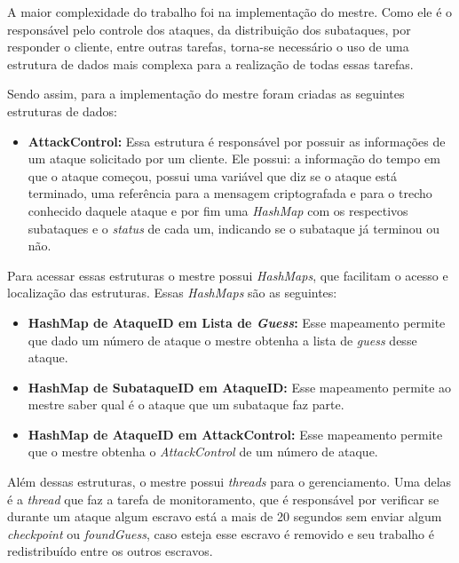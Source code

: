 \documentclass[
	12pt,				%
    oneside,			%
	a4paper,			%
	english,			%
	brazil,				%
	]{abntex2}
\begin{document}
A maior complexidade do trabalho foi na implementação do mestre. Como ele é o responsável pelo controle dos ataques, 
da distribuição dos subataques, por responder o cliente, entre outras tarefas, torna-se necessário o uso de uma estrutura 
de dados mais complexa para a realização de todas essas tarefas.

Sendo assim, para a implementação do mestre foram criadas as seguintes estruturas de dados:

\begin{itemize}

	\item \textbf{AttackControl:} Essa estrutura é responsável por possuir as informações de um ataque solicitado por um
	cliente. Ele possui: a informação do tempo em que o ataque começou, possui uma variável que diz se o ataque está 
	terminado, uma referência para a mensagem criptografada e para o trecho conhecido daquele ataque e por fim uma 
	\textit{HashMap} com os respectivos subataques e o \textit{status} de cada um, indicando se o subataque já terminou ou 
	não.
	
\end{itemize}

Para acessar essas estruturas o mestre possui \textit{HashMaps}, que facilitam o acesso e localização das estruturas. 
Essas \textit{HashMaps} são as seguintes:

\begin{itemize}

	\item \textbf{HashMap de AtaqueID em Lista de \textit{Guess}:} Esse mapeamento permite que dado um número de ataque o
	mestre obtenha a lista de \textit{guess} desse ataque.
	
	\item \textbf{HashMap de SubataqueID em AtaqueID:} Esse mapeamento permite ao mestre saber qual é o ataque que um 
	subataque faz parte.
	
	\item \textbf{HashMap de AtaqueID em AttackControl:} Esse mapeamento permite que o mestre obtenha o
	\textit{AttackControl} de um número de ataque.
	
\end{itemize}

Além dessas estruturas, o mestre possui \textit{threads} para o gerenciamento. Uma delas é a \textit{thread} que faz a tarefa
de monitoramento, que é responsável por verificar se durante um ataque algum escravo está a mais de 20 segundos sem enviar
algum \textit{checkpoint} ou \textit{foundGuess}, caso esteja esse escravo é removido e seu trabalho é redistribuído entre os
outros escravos.
\end{document}
